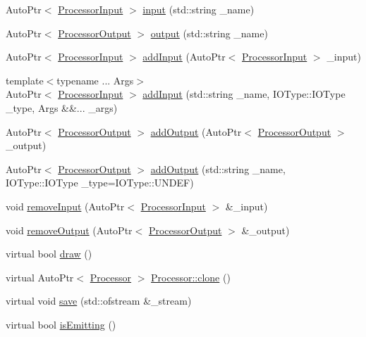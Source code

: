 \begin{DoxyCompactItemize}
\item 
Auto\+Ptr$<$ \mbox{\hyperlink{class_chill_1_1_processor_input}{Processor\+Input}} $>$ \mbox{\hyperlink{class_chill_1_1_processor_af7e4fd8473b311ac572825193331d1e6}{input}} (std\+::string \+\_\+name)
\item 
Auto\+Ptr$<$ \mbox{\hyperlink{class_chill_1_1_processor_output}{Processor\+Output}} $>$ \mbox{\hyperlink{class_chill_1_1_processor_a26494f059d01af50bd66462e8c14fdb9}{output}} (std\+::string \+\_\+name)
\item 
Auto\+Ptr$<$ \mbox{\hyperlink{class_chill_1_1_processor_input}{Processor\+Input}} $>$ \mbox{\hyperlink{class_chill_1_1_processor_a771c81e8f921566a6ee719845c2f1e23}{add\+Input}} (Auto\+Ptr$<$ \mbox{\hyperlink{class_chill_1_1_processor_input}{Processor\+Input}} $>$ \+\_\+input)
\item 
{\footnotesize template$<$typename ... Args$>$ }\\Auto\+Ptr$<$ \mbox{\hyperlink{class_chill_1_1_processor_input}{Processor\+Input}} $>$ \mbox{\hyperlink{class_chill_1_1_processor_aa7180f4172236f0dabe725a5eabe9900}{add\+Input}} (std\+::string \+\_\+name, I\+O\+Type\+::\+I\+O\+Type \+\_\+type, Args \&\&... \+\_\+args)
\item 
Auto\+Ptr$<$ \mbox{\hyperlink{class_chill_1_1_processor_output}{Processor\+Output}} $>$ \mbox{\hyperlink{class_chill_1_1_processor_a07fdef0cf1b7c20d39739ec287ea2f87}{add\+Output}} (Auto\+Ptr$<$ \mbox{\hyperlink{class_chill_1_1_processor_output}{Processor\+Output}} $>$ \+\_\+output)
\item 
Auto\+Ptr$<$ \mbox{\hyperlink{class_chill_1_1_processor_output}{Processor\+Output}} $>$ \mbox{\hyperlink{class_chill_1_1_processor_a2bb867802937d84cb94941ebbbf43ff8}{add\+Output}} (std\+::string \+\_\+name, I\+O\+Type\+::\+I\+O\+Type \+\_\+type=I\+O\+Type\+::\+U\+N\+D\+EF)
\item 
void \mbox{\hyperlink{class_chill_1_1_processor_afff216d6d38739af754c4d6e62702214}{remove\+Input}} (Auto\+Ptr$<$ \mbox{\hyperlink{class_chill_1_1_processor_input}{Processor\+Input}} $>$ \&\+\_\+input)
\item 
void \mbox{\hyperlink{class_chill_1_1_processor_adf8c383a1b90606599e42c85f12ea7cd}{remove\+Output}} (Auto\+Ptr$<$ \mbox{\hyperlink{class_chill_1_1_processor_output}{Processor\+Output}} $>$ \&\+\_\+output)
\item 
virtual bool \mbox{\hyperlink{class_chill_1_1_processor_a2eb86d9750e1c0d5ac7f6da166aca8fd}{draw}} ()
\item 
virtual Auto\+Ptr$<$ \mbox{\hyperlink{class_chill_1_1_processor}{Processor}} $>$ \mbox{\hyperlink{class_chill_1_1_processor_ad3cc90a592d8755afb546e9b701489e4}{Processor\+::clone}} ()
\item 
virtual void \mbox{\hyperlink{class_chill_1_1_processor_a476a6eddddef2f44827e4d9de530d706}{save}} (std\+::ofstream \&\+\_\+stream)
\item 
virtual bool \mbox{\hyperlink{class_chill_1_1_processor_a209a0c41fc704874da8c2c10371d1b79}{is\+Emitting}} ()
\end{DoxyCompactItemize}
